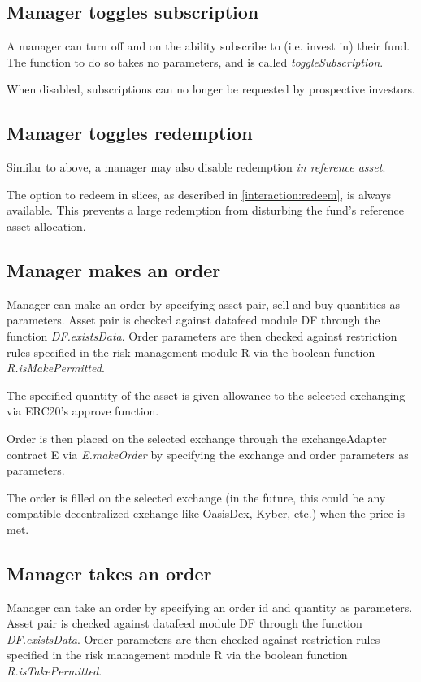 \documentclass[conference]{IEEEtran}
\begin{document}
\subsection{Manager toggles subscription}

A manager can turn off and on the ability subscribe to (i.e. invest in) their fund.
The function to do so takes no parameters, and is called \textit{toggleSubscription}.

When disabled, subscriptions can no longer be requested by prospective investors.

\subsection{Manager toggles redemption}

Similar to above, a manager may also disable redemption \textit{in reference asset}.

The option to redeem in slices, as described in \ref{interaction:redeem}, is always available. This prevents a large redemption from disturbing the fund's reference asset allocation.

\subsection{Manager makes an order}

Manager can make an order by specifying asset pair, sell and buy quantities as parameters. Asset pair is checked against datafeed module DF through the function \textit{DF.existsData}. Order parameters are then checked against restriction rules specified in the risk management module R via the boolean function \textit{R.isMakePermitted}.

The specified quantity of the asset is given allowance to the selected exchanging via ERC20's approve function.

Order is then placed on the selected exchange through the exchangeAdapter contract E via \textit{E.makeOrder} by specifying the exchange and order parameters as parameters.

The order is filled on the selected exchange (in the future, this could be any compatible decentralized exchange like OasisDex, Kyber, etc.) when the price is met.

\subsection{Manager takes an order}

Manager can take an order by specifying an order id and quantity as parameters. Asset pair is checked against datafeed module DF through the function \textit{DF.existsData}. Order parameters are then checked against restriction rules specified in the risk management module R via the boolean function \textit{R.isTakePermitted}.
\end{document}
